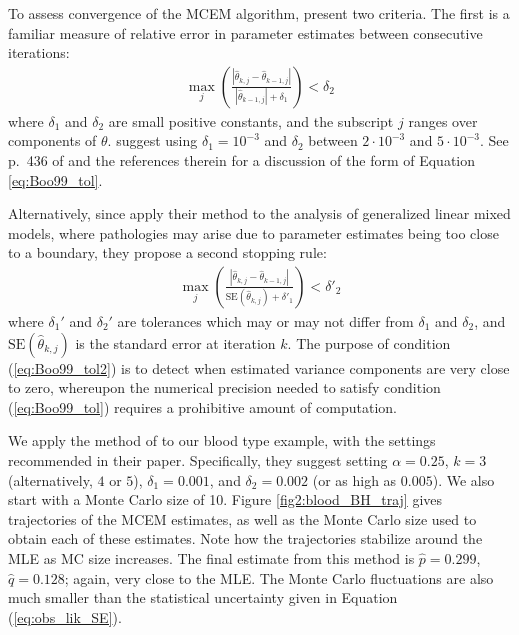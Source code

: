 \documentclass[11pt, oneside]{article}   	%
\begin{document}
To assess convergence of the MCEM algorithm, \citeauthor{Boo99} present two criteria. The first is a familiar measure of relative error in parameter estimates between consecutive iterations:
%
\begin{align}
    \max_j \left( \frac{\left| \hat{\theta}_{k, j} - \hat{\theta}_{k-1,j} \right|}{\left| \hat{\theta}_{k-1,j} \right| + \delta_1} \right) < \delta_2 \label{eq:Boo99_tol}
\end{align}
%
where $\delta_1$ and $\delta_2$ are small positive constants, and the subscript $j$ ranges over components of $\theta$. \citeauthor{Boo99} suggest using $\delta_1 = 10^{-3}$ and $\delta_2$ between $2 \cdot 10^{-3}$ and $5 \cdot 10^{-3}$. See p.\ 436 of \citet{Sea06} and the references therein for a discussion of the form of Equation \ref{eq:Boo99_tol}.

Alternatively, since \citeauthor{Boo99} apply their method to the analysis of generalized linear mixed models, where pathologies may arise due to parameter estimates being too close to a boundary, they propose a second stopping rule:
%
\begin{align}
    \max_j \left( \frac{\left| \hat{\theta}_{k, j} - \hat{\theta}_{k-1,j} \right|}{\mathrm{SE}\left(\hat{\theta}_{k,j}\right) + \delta'_1} \right) < \delta'_2 \label{eq:Boo99_tol2}
\end{align}
%
where $\delta_1'$ and $\delta_2'$ are tolerances which may or may not differ from $\delta_1$ and $\delta_2$, and $\mathrm{SE}\left(\hat{\theta}_{k,j}\right)$ is the standard error at iteration $k$. The purpose of condition (\ref{eq:Boo99_tol2}) is to detect when estimated variance components are very close to zero, whereupon the numerical precision needed to satisfy condition (\ref{eq:Boo99_tol}) requires a prohibitive amount of computation.

We apply the method of \citeauthor{Boo99} to our blood type example, with the settings recommended in their paper. Specifically, they suggest setting $\alpha = 0.25$, $k = 3$ (alternatively, $4$ or $5$), $\delta_1 = 0.001$, and $\delta_2 = 0.002$ (or as high as $0.005$). We also start with a Monte Carlo size of 10. Figure \ref{fig2:blood_BH_traj} gives trajectories of the MCEM estimates, as well as the Monte Carlo size used to obtain each of these estimates. Note how the trajectories stabilize around the MLE as MC size increases. The final estimate from this method is $\hat{p} = 0.299$, $\hat{q} = 0.128$; again, very close to the MLE. The Monte Carlo fluctuations are also much smaller than the statistical uncertainty given in Equation (\ref{eq:obs_lik_SE}).
\end{document}
